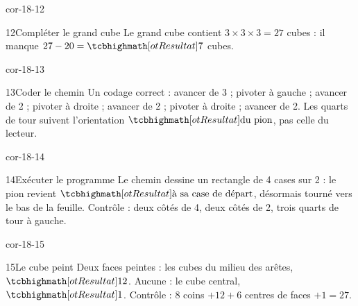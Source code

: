 \begin{blocLivre}{cor-18-12}\begin{corrige}{12}{Compléter le grand cube}
Le grand cube contient $3\times3\times3=27$ cubes : il manque $27-20=\res7$ cubes.
\label{fig-cor-18-12}
\end{corrige}\end{blocLivre}
\begin{blocLivre}{cor-18-13}\begin{corrige}{13}{Coder le chemin}
Un codage correct : avancer de 3 ; pivoter à gauche ; avancer de 2 ; pivoter à droite ; avancer de 2 ; pivoter à droite ; avancer de 2. Les quarts de tour suivent l’orientation $\res{\text{du pion}}$, pas celle du lecteur.
\label{fig-cor-18-13}
\end{corrige}\end{blocLivre}
\begin{blocLivre}{cor-18-14}\begin{corrige}{14}{Exécuter le programme}
Le chemin dessine un rectangle de 4 cases sur 2 : le pion revient $\res{\text{à sa case de départ}}$, désormais tourné vers le bas de la feuille. Contrôle : deux côtés de 4, deux côtés de 2, trois quarts de tour à gauche.
\label{fig-cor-18-14}
\end{corrige}\end{blocLivre}
\begin{blocLivre}{cor-18-15}\begin{corrige}{15}{Le cube peint}
Deux faces peintes : les cubes du milieu des arêtes, $\res{12}$. Aucune : le cube central, $\res1$. Contrôle : $8$ coins $+12+6$ centres de faces $+1=27$.
\label{fig-cor-18-15}
\end{corrige}\end{blocLivre}
